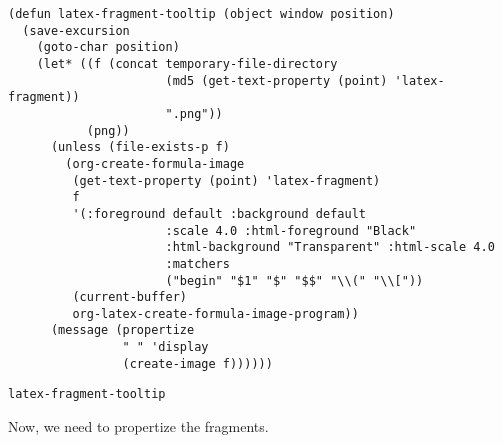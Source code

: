 \documentclass[11pt]{article}
\begin{document}
\begin{verbatim}
(defun latex-fragment-tooltip (object window position)
  (save-excursion
    (goto-char position)
    (let* ((f (concat temporary-file-directory
                      (md5 (get-text-property (point) 'latex-fragment))
                      ".png"))
           (png))
      (unless (file-exists-p f)
        (org-create-formula-image
         (get-text-property (point) 'latex-fragment)
         f
         '(:foreground default :background default
                      :scale 4.0 :html-foreground "Black"
                      :html-background "Transparent" :html-scale 4.0
                      :matchers
                      ("begin" "$1" "$" "$$" "\\(" "\\["))
         (current-buffer)
         org-latex-create-formula-image-program))
      (message (propertize
                " " 'display
                (create-image f))))))
\end{verbatim}

\begin{verbatim}
latex-fragment-tooltip
\end{verbatim}

Now, we need to propertize the fragments.
\end{document}
